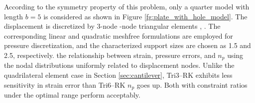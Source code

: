 According to the symmetry property of this problem, only a quarter model with length $b=5$ is considered as shown in Figure \ref{fg:plate_with_hole_model}. The displacement is discretized by 3-node \DIFaddbegin \DIFadd{, }-node triangular elements ,  \DIFaddbegin {}\DIFaddend . The corresponding linear and quadratic meshfree formulations are employed for pressure discretization, and the characterized support sizes are chosen as 1.5 and 2.5, respectively.
 \DIFaddbegin {}\DIFaddend the relationship between strain, pressure errors, and $n_p$ using the nodal distributions uniformly related to displacement nodes.
Unlike the quadrilateral element case in Section \ref{sec:cantilever},  \DIFaddbegin {}\DIFaddend Tri3--RK exhibits less sensitivity in strain error than Tri6--RK \DIFaddbegin {}\DIFaddend $n_p$ goes up.
Both  \DIFaddbegin {}\DIFaddend with constraint ratios under the optimal range perform acceptably. 

